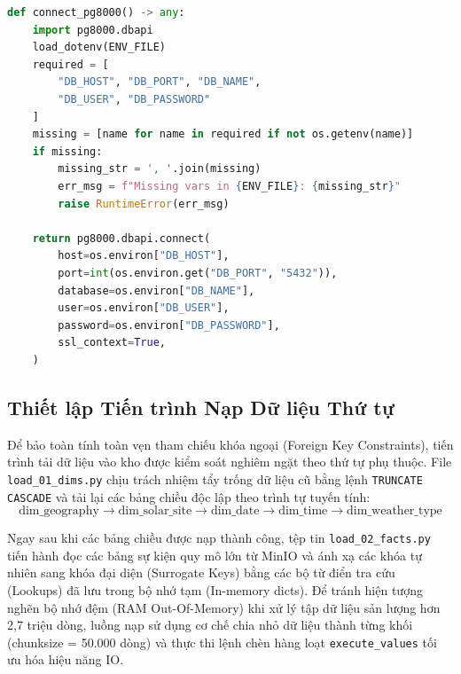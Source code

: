 \documentclass[12pt, a4paper]{report}
\begin{document}
\begin{lstlisting}[language=Python, caption={Mã nguồn thiết lập kết nối cơ sở dữ liệu qua Pooler bằng pg8000}, label={lst:pg8000_conn}]
def connect_pg8000() -> any:
    import pg8000.dbapi
    load_dotenv(ENV_FILE)
    required = [
        "DB_HOST", "DB_PORT", "DB_NAME", 
        "DB_USER", "DB_PASSWORD"
    ]
    missing = [name for name in required if not os.getenv(name)]
    if missing:
        missing_str = ', '.join(missing)
        err_msg = f"Missing vars in {ENV_FILE}: {missing_str}"
        raise RuntimeError(err_msg)

    return pg8000.dbapi.connect(
        host=os.environ["DB_HOST"],
        port=int(os.environ.get("DB_PORT", "5432")),
        database=os.environ["DB_NAME"],
        user=os.environ["DB_USER"],
        password=os.environ["DB_PASSWORD"],
        ssl_context=True,
    )
\end{lstlisting}

\subsection{Thiết lập Tiến trình Nạp Dữ liệu Thứ tự}
Để bảo toàn tính toàn vẹn tham chiếu khóa ngoại (Foreign Key Constraints), tiến trình tải dữ liệu vào kho được kiểm soát nghiêm ngặt theo thứ tự phụ thuộc. File \texttt{load\_01\_dims.py} chịu trách nhiệm tẩy trống dữ liệu cũ bằng lệnh \texttt{TRUNCATE CASCADE} và tải lại các bảng chiều độc lập theo trình tự tuyến tính:
\begin{equation*}
\text{dim\_geography} \longrightarrow \text{dim\_solar\_site} \longrightarrow \text{dim\_date} \longrightarrow \text{dim\_time} \longrightarrow \text{dim\_weather\_type}
\end{equation*}

Ngay sau khi các bảng chiều được nạp thành công, tệp tin \texttt{load\_02\_facts.py} tiến hành đọc các bảng sự kiện quy mô lớn từ MinIO và ánh xạ các khóa tự nhiên sang khóa đại diện (Surrogate Keys) bằng các bộ từ điển tra cứu (Lookups) đã lưu trong bộ nhớ tạm (In-memory dicts). Để tránh hiện tượng nghẽn bộ nhớ đệm (RAM Out-Of-Memory) khi xử lý tập dữ liệu sản lượng hơn 2,7 triệu dòng, luồng nạp sử dụng cơ chế chia nhỏ dữ liệu thành từng khối (chunksize = 50.000 dòng) và thực thi lệnh chèn hàng loạt \texttt{execute\_values} tối ưu hóa hiệu năng IO.
\end{document}
